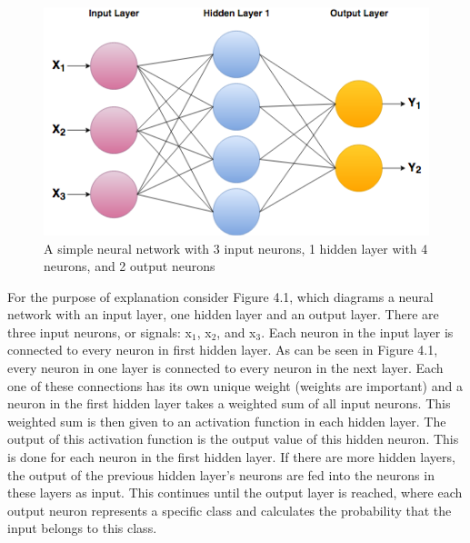 \documentclass[12pt]{report} %
\begin{document}
\begin{figure}
\centering
\includegraphics[width=5in]{NeuralNetwork}
\caption[Simple Neural Network]
	{A simple neural network with 3 input neurons, 1 hidden layer with 4 neurons, and 2 output neurons}
\end{figure}
	For the purpose of explanation consider Figure 4.1, which diagrams a neural network with an input layer, one hidden layer and an output layer. There are three input neurons, or signals: x$_{1}$, x$_{2}$, and x$_{3}$. Each neuron in the input layer is connected to every neuron in first hidden layer. As can be seen in Figure 4.1, every neuron in one layer is connected to every neuron in the next layer. Each one of these connections has its own unique weight (weights are important) and a neuron in the first hidden layer takes a weighted sum of all input neurons. This weighted sum is then given to an activation function in each hidden layer. The output of this activation function is the output value of this hidden neuron. This is done for each neuron in the first hidden layer. If there are more hidden layers, the output of the previous hidden layer's neurons are fed into the neurons in these layers as input. This continues until the output layer is reached, where each output neuron represents a specific class and calculates the probability that the input belongs to this class.\cite{KubatMachineLearn}
	
\end{document}
